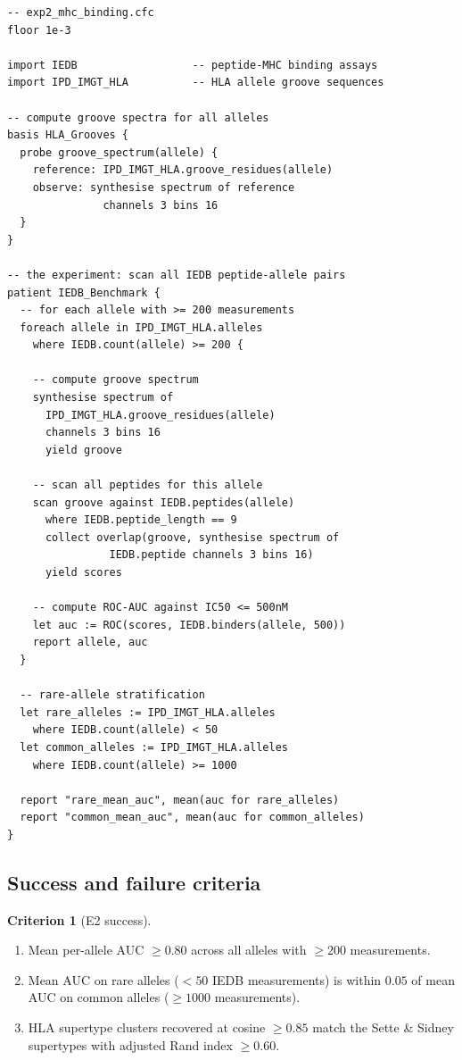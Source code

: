 \documentclass[11pt,a4paper]{article}
\theoremstyle{expthm}
\theoremstyle{definition}
\newtheorem{criterion}[theorem]{Criterion}
\theoremstyle{remark}
\begin{document}
\begin{lstlisting}[caption={E2: spectral MHC binding on IEDB.}]
-- exp2_mhc_binding.cfc
floor 1e-3

import IEDB                  -- peptide-MHC binding assays
import IPD_IMGT_HLA          -- HLA allele groove sequences

-- compute groove spectra for all alleles
basis HLA_Grooves {
  probe groove_spectrum(allele) {
    reference: IPD_IMGT_HLA.groove_residues(allele)
    observe: synthesise spectrum of reference
               channels 3 bins 16
  }
}

-- the experiment: scan all IEDB peptide-allele pairs
patient IEDB_Benchmark {
  -- for each allele with >= 200 measurements
  foreach allele in IPD_IMGT_HLA.alleles
    where IEDB.count(allele) >= 200 {

    -- compute groove spectrum
    synthesise spectrum of
      IPD_IMGT_HLA.groove_residues(allele)
      channels 3 bins 16
      yield groove

    -- scan all peptides for this allele
    scan groove against IEDB.peptides(allele)
      where IEDB.peptide_length == 9
      collect overlap(groove, synthesise spectrum of
                IEDB.peptide channels 3 bins 16)
      yield scores

    -- compute ROC-AUC against IC50 <= 500nM
    let auc := ROC(scores, IEDB.binders(allele, 500))
    report allele, auc
  }

  -- rare-allele stratification
  let rare_alleles := IPD_IMGT_HLA.alleles
    where IEDB.count(allele) < 50
  let common_alleles := IPD_IMGT_HLA.alleles
    where IEDB.count(allele) >= 1000

  report "rare_mean_auc", mean(auc for rare_alleles)
  report "common_mean_auc", mean(auc for common_alleles)
}
\end{lstlisting}

\subsection{Success and failure criteria}

\begin{criterion}[E2 success]
\label{crit:e2-success}
\leavevmode
\begin{enumerate}[label=(\alph*),leftmargin=1.8em,itemsep=2pt]
\item Mean per-allele AUC $\geq 0.80$ across all alleles with
  $\geq 200$ measurements.
\item Mean AUC on rare alleles ($< 50$ IEDB measurements) is within
  $0.05$ of mean AUC on common alleles ($\geq 1000$ measurements).
\item HLA supertype clusters recovered at cosine $\geq 0.85$ match the
  Sette \& Sidney supertypes with adjusted Rand index $\geq 0.60$.
\end{enumerate}
\end{criterion}
\end{document}
